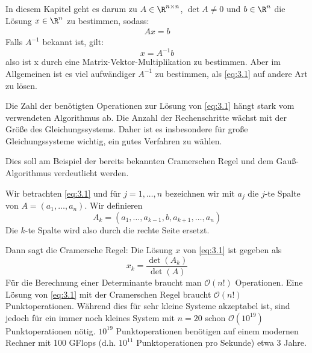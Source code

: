 \documentclass{mycourse}
\begin{document}
In diesem Kapitel geht es darum zu $A\in \R^{n\times n}$, $\det A\neq 0$ und $b\in \R^n$ die Lösung $x\in\R^n$ zu bestimmen, sodass:
\begin{align}
\label{eq:3.1}
Ax=b
\end{align}
Falls $A^{-1}$ bekannt ist, gilt:
\[
x=A^{-1}b
\]
also ist x durch eine Matrix-Vektor-Multiplikation zu bestimmen.
Aber im Allgemeinen ist es viel aufwändiger $A^{-1}$ zu bestimmen, als \eqref{eq:3.1} auf andere Art zu lösen.

Die Zahl der benötigten Operationen zur Lösung von \eqref{eq:3.1} hängt stark vom verwendeten Algorithmus ab.
Die Anzahl der Rechenschritte wächst mit der Größe des Gleichungssystems.
Daher ist es insbesondere für große Gleichungssysteme wichtig, ein gutes Verfahren zu wählen.

Dies soll am Beispiel der bereits bekannten Cramerschen Regel und dem Gauß-Algorithmus verdeutlicht werden.

\begin{ex}
\label{ex:3.1}
Wir betrachten \eqref{eq:3.1} und für $j=1,\dotsc,n$ bezeichnen wir mit $a_j$ die $j$-te Spalte von $A=(a_1,\dotsc,a_n)$.
Wir definieren
\[
A_k = (a_1,\dotsc,a_{k-1},b,a_{k+1},\dotsc,a_n)
\]
Die $k$-te Spalte wird also durch die rechte Seite ersetzt.

Dann sagt die Cramersche Regel:
Die Lösung $x$ von \eqref{eq:3.1} ist gegeben als
\[
x_k = \frac {\det(A_k)}{\det(A)}
\]
Für die Berechnung einer Determinante braucht man $\mathcal O(n!)$ Operationen.
Eine Lösung von \eqref{eq:3.1} mit der Cramerschen Regel braucht $\mathcal O(n!)$  Punktoperationen.
Während dies für sehr kleine Systeme akzeptabel ist, sind jedoch für ein immer noch kleines System mit $n=20$ schon $\mathcal{O}(10^{19})$ Punktoperationen nötig. $10^{19}$ Punktoperationen benötigen auf einem modernen Rechner mit 100 GFlops (d.h. $10^{11}$ Punktoperationen pro Sekunde) etwa 3 Jahre.
\end{ex}
\end{document}
